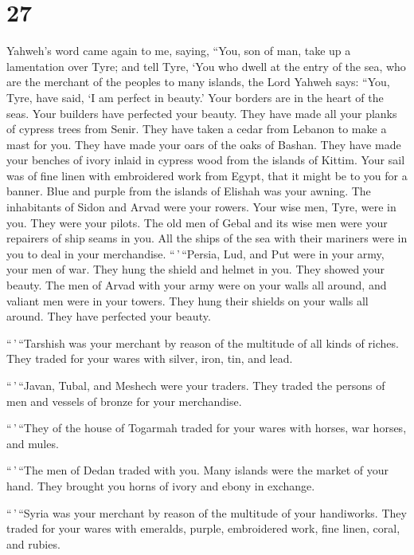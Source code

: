 \hypertarget{section-25}{%
\section{27}\label{section-25}}

 Yahweh's word came again to me, saying, 
``You, son of man, take up a lamentation over Tyre;  and
tell Tyre, `You who dwell at the entry of the sea, who are the merchant
of the peoples to many islands, the Lord Yahweh says: ``You, Tyre, have
said, `I am perfect in beauty.'  Your borders are in the
heart of the seas. Your builders have perfected your beauty.
 They have made all your planks of cypress trees from
Senir. They have taken a cedar from Lebanon to make a mast for you.
 They have made your oars of the oaks of Bashan. They have
made your benches of ivory inlaid in cypress wood from the islands of
Kittim.  Your sail was of fine linen with embroidered work
from Egypt, that it might be to you for a banner. Blue and purple from
the islands of Elishah was your awning.  The inhabitants
of Sidon and Arvad were your rowers. Your wise men, Tyre, were in you.
They were your pilots.  The old men of Gebal and its wise
men were your repairers of ship seams in you. All the ships of the sea
with their mariners were in you to deal in your merchandise.
 ``\,'\,``Persia, Lud, and Put were in your army, your
men of war. They hung the shield and helmet in you. They showed your
beauty.  The men of Arvad with your army were on your
walls all around, and valiant men were in your towers. They hung their
shields on your walls all around. They have perfected your beauty.

 ``\,'\,``Tarshish was your merchant by reason of the
multitude of all kinds of riches. They traded for your wares with
silver, iron, tin, and lead.

 ``\,'\,``Javan, Tubal, and Meshech were your traders.
They traded the persons of men and vessels of bronze for your
merchandise.

 ``\,'\,``They of the house of Togarmah traded for your
wares with horses, war horses, and mules.

 ``\,'\,``The men of Dedan traded with you. Many islands
were the market of your hand. They brought you horns of ivory and ebony
in exchange.

 ``\,'\,``Syria was your merchant by reason of the
multitude of your handiworks. They traded for your wares with emeralds,
purple, embroidered work, fine linen, coral, and rubies.

